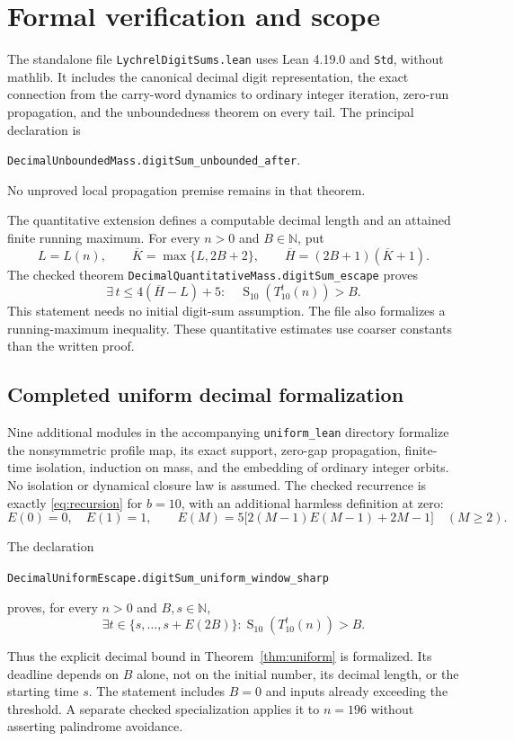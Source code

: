 \documentclass[11pt]{article}
\newcommand{\ds}{\operatorname{S}}
\begin{document}
\section{Formal verification and scope}
The standalone file \texttt{LychrelDigitSums.lean} uses Lean 4.19.0 and
\texttt{Std}, without mathlib. It includes the canonical decimal digit
representation, the exact connection from the carry-word dynamics to
ordinary integer iteration, zero-run propagation, and the unboundedness
theorem on every tail. The principal declaration is
\begin{center}
\texttt{DecimalUnboundedMass.digitSum\_unbounded\_after}.
\end{center}
No unproved local propagation premise remains in that theorem.

The quantitative extension defines a computable decimal length and an
attained finite running maximum. For every $n>0$ and $B\in\mathbb N$, put
\[
 L=L(n),\qquad \overline K=\max\{L,2B+2\},\qquad
 \overline H=(2B+1)(\overline K+1).
\]
The checked theorem \texttt{DecimalQuantitativeMass.digitSum\_escape}
proves
\[
 \exists\,t\leq4(\overline H-L)+5:\quad \ds_{10}(T_{10}^t(n))>B.
\]
This statement needs no initial digit-sum assumption. The file also
formalizes a running-maximum inequality. These quantitative estimates use
coarser constants than the written proof.

\subsection*{Completed uniform decimal formalization}
Nine additional modules in the accompanying \texttt{uniform\_lean}
directory formalize the nonsymmetric profile map, its exact support,
zero-gap propagation, finite-time isolation, induction on mass, and the
embedding of ordinary integer orbits. No isolation or dynamical closure
law is assumed. The checked recurrence is exactly \eqref{eq:recursion}
for $b=10$, with an additional harmless definition at zero:
\[
 E(0)=0,\quad E(1)=1,\qquad
 E(M)=5\bigl[2(M-1)E(M-1)+2M-1\bigr]\quad(M\geq2).
\]
\begin{samepage}
The declaration
\begin{center}
\texttt{DecimalUniformEscape.digitSum\_uniform\_window\_sharp}
\end{center}
proves, for every $n>0$ and $B,s\in\mathbb N$,
\[
 \exists t\in\{s,\ldots,s+E(2B)\}:
       \ds_{10}(T_{10}^t(n))>B.
\]
\end{samepage}
Thus the explicit decimal bound in Theorem~\ref{thm:uniform} is formalized.
Its deadline depends on $B$ alone, not on the initial number, its decimal
length, or the starting time $s$. The statement includes $B=0$ and inputs
already exceeding the threshold. A separate checked specialization applies
it to $n=196$ without asserting palindrome avoidance.
\end{document}
